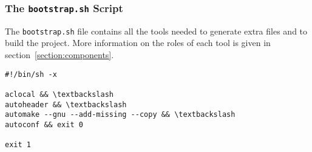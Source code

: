 \subsubsection{The \texttt{bootstrap.sh} Script}
The \texttt{bootstrap.sh} file contains all the tools needed to generate extra files and to build the project. More information on the roles of each tool is given in section~\ref{section:components}.

\begin{minipage}{.5\paperwidth}
\begin{mylisting}
\begin{Verbatim}[commandchars=\\\{\},fontsize=\scriptsize, numbersep=2pt]
#!/bin/sh -x

aclocal && \textbackslash
autoheader && \textbackslash
automake --gnu --add-missing --copy && \textbackslash
autoconf && exit 0

exit 1
\end{Verbatim}
\end{mylisting}
\end{minipage}
